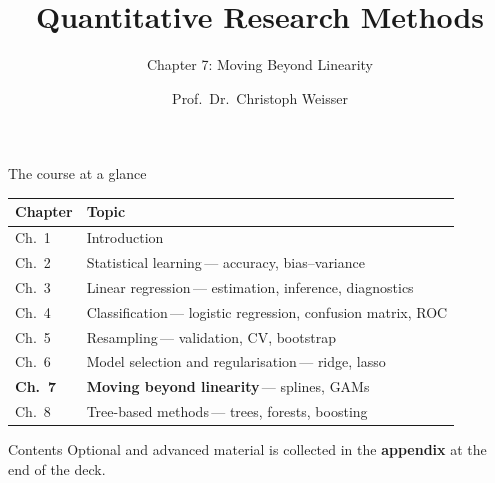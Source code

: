 \documentclass[aspectratio=169,11pt]{beamer}
\title{Quantitative Research Methods}
\subtitle{Chapter 7: Moving Beyond Linearity}
\author{Prof.\ Dr.\ Christoph Weisser}
\date{}\graphicspath{{images/}}
\begin{document}
\begin{frame}[plain]\titlepage\end{frame}

\begin{frame}{The course at a glance}
  \vspace{-1.5mm}
  \begin{center}
  \scriptsize
  \setlength{\tabcolsep}{5pt}
  \renewcommand{\arraystretch}{1.30}
  \begin{tabular}{@{\hspace{2pt}}l >{\raggedright\arraybackslash}p{}@{\hspace{2pt}}}
    \toprule
    \textbf{Chapter} & \textbf{Topic} \\
    \midrule
     {\color{accent}Ch.\ 1} & Introduction \\
    \rowcolor{black!3} {\color{accent}Ch.\ 2} & Statistical learning\,{\color{black!45}--- accuracy, bias--variance} \\
     {\color{accent}Ch.\ 3} & Linear regression\,{\color{black!45}--- estimation, inference, diagnostics} \\
    \rowcolor{black!3} {\color{accent}Ch.\ 4} & Classification\,{\color{black!45}--- logistic regression, confusion matrix, ROC} \\
     {\color{accent}Ch.\ 5} & Resampling\,{\color{black!45}--- validation, CV, bootstrap} \\
    \rowcolor{black!3} {\color{accent}Ch.\ 6} & Model selection and regularisation\,{\color{black!45}--- ridge, lasso} \\
    \rowcolor{accent!18} \textbf{Ch.\ 7} & \textbf{Moving beyond linearity}\,{\color{accent!75!black}--- splines, GAMs} \\
    \rowcolor{black!3} {\color{accent}Ch.\ 8} & Tree-based methods\,{\color{black!45}--- trees, forests, boosting} \\
    \bottomrule
  \end{tabular}
  \end{center}
\end{frame}


\begin{frame}{Contents}\small
  \tableofcontents[hideallsubsections]
  \vfill
  {\tiny Optional and advanced material is collected in the \textbf{appendix} at the end of the deck.}
\end{frame}
\end{document}
